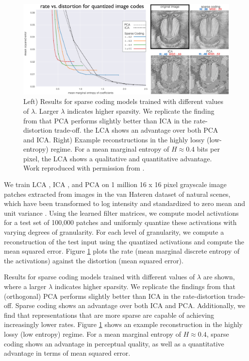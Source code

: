 \begin{figure}[ht]
    \centering
    \includegraphics[width=\textwidth]{figures/rate_distortion.png}
    \caption{ Left) Results for sparse coding models trained with different values of $\lambda$. Larger $\lambda$ indicates higher sparsity. We replicate the finding from \parencite{eichhorn2009natural} that PCA performs slightly better than ICA in the rate-distortion trade-off. the LCA shows an advantage over both PCA and ICA. Right) Example reconstructions in the highly lossy (low-entropy) regime. For a mean marginal entropy of $H \approx 0.4$ bits per pixel, the LCA shows a qualitative and quantitative advantage. Work reproduced with permission from \parencite{sanborn2016sampling}.}
    \label{fig:ch4_rate_distortion}
\end{figure}

We train LCA \parencite{rozell2008sparse}, ICA \parencite{bell1997independent}, and PCA on 1 million 16 x 16 pixel grayscale image patches extracted from images in the van Hateren dataset of natural scenes, which have been transformed to log intensity and standardized to zero mean and unit variance \parencite{vanHateren1998independent}. Using the learned filter matrices, we compute model activations for a test set of 100,000 patches and uniformly quantize these activations with varying degrees of granularity. For each level of granularity, we compute a reconstruction of the test input using the quantized activations and compute the mean squared error. Figure \ref{fig:ch4_rate_distortion} plots the rate (mean marginal discrete entropy of the activations) against the distortion (mean squared error).

Results for sparse coding models trained with different values of $\lambda$ are shown, where a larger $\lambda$ indicates higher sparsity. We replicate the findings from \parencite{eichhorn2009natural} that (orthogonal) PCA  performs slightly better than ICA in the rate-distortion trade-off. Sparse coding shows an advantage over both ICA and PCA. Additionally, we find that representations that are more sparse are capable of achieving increasingly lower rates. Figure \ref{fig:ch4_rate_distortion} shows an example reconstruction in the highly lossy (low entropy) regime. For a mean marginal entropy of $H\approx 0.4$, sparse coding shows an advantage in perceptual quality, as well as a quantitative advantage in terms of mean squared error.


